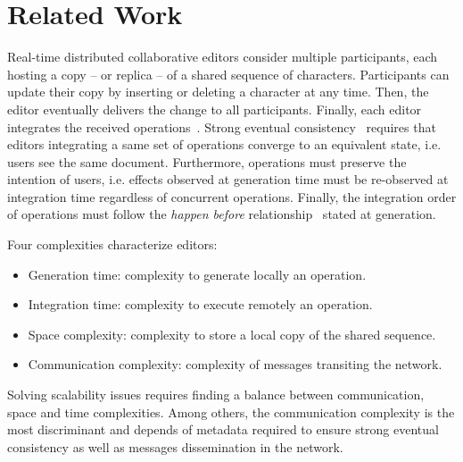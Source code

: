 \section{Related Work}
\label{sec:relatedwork}

Real-time distributed collaborative editors consider multiple participants, each
hosting a copy -- or replica -- of a shared sequence of characters. Participants
can update their copy by inserting or deleting a character at any time. Then,
the editor eventually delivers the change to all participants. Finally, each
editor integrates the received operations~\cite{saito2005optimistic}. Strong
eventual consistency~\cite{bailis2013eventual, shapiro2011comprehensive,
  sun1998achieving} requires that editors integrating a same set of operations
converge to an equivalent state, i.e. users see the same document. Furthermore,
operations must preserve the intention of users, i.e. effects observed at
generation time must be re-observed at integration time regardless of concurrent
operations. Finally, the integration order of operations must follow the
\emph{happen before} relationship~\cite{lamport1978time} stated at generation.

Four complexities characterize editors:
\begin{itemize}
\item Generation time: complexity to generate locally an operation.
\item Integration time: complexity to execute remotely an operation.
\item Space complexity: complexity to store a local copy of the shared sequence.
\item Communication complexity: complexity of messages transiting the network.
\end{itemize}
Solving scalability issues requires finding a balance between communication,
space and time complexities.  Among others, the communication complexity is the
most discriminant and depends of metadata required to ensure strong eventual
consistency as well as messages dissemination in the network.


